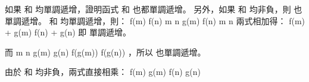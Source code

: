 \startEXERCISE
如果  和  均單調遞增，證明函式  和  也都單調遞增。
另外，如果  和  均非負，則  也單調遞增。
\stopEXERCISE
\startANSWER
{} 和  均單調遞增，則：
\startsplitformula\startmathalignment
 \NC f(m) \leq f(n) \NC \quad {} m \leq n \NR
 \NC g(m) \leq f(n) \NC \quad {} m \leq n \NR
\stopmathalignment\stopsplitformula
兩式相加得：
\startformula
f(m) + g(m) \leq f(n) + g(n)
\stopformula
即  單調遞增。

而
\startsplitformula\startmathalignment
 \NC m \NC \leq n \NR
\NC g(m) \NC \leq g(n) \NR
\NC f(g(m)) \NC \leq f(g(n)) \NR
\stopmathalignment\stopsplitformula
，所以  也單調遞增。

由於  和  均非負，兩式直接相乘：
\startformula
f(m) \cdot g(m) \leq f(n) \cdot g(n)
\stopformula
\stopANSWER
